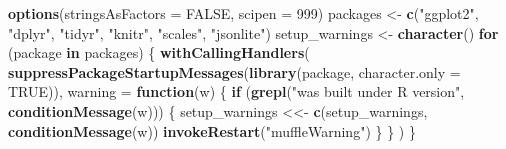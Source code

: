 \documentclass[
]{article}
\newenvironment{Shaded}{\begin{snugshade}}{\end{snugshade}}
\newcommand{\AttributeTok}[1]{\textcolor[rgb]{0.13,0.29,0.53}{#1}}
\newcommand{\ConstantTok}[1]{\textcolor[rgb]{0.56,0.35,0.01}{#1}}
\newcommand{\ControlFlowTok}[1]{\textcolor[rgb]{0.13,0.29,0.53}{\textbf{#1}}}
\newcommand{\DecValTok}[1]{\textcolor[rgb]{0.00,0.00,0.81}{#1}}
\newcommand{\FunctionTok}[1]{\textcolor[rgb]{0.13,0.29,0.53}{\textbf{#1}}}
\newcommand{\NormalTok}[1]{#1}
\newcommand{\OtherTok}[1]{\textcolor[rgb]{0.56,0.35,0.01}{#1}}
\newcommand{\StringTok}[1]{\textcolor[rgb]{0.31,0.60,0.02}{#1}}
\begin{document}
\begin{Shaded}
\begin{Highlighting}[]
\FunctionTok{options}\NormalTok{(}\AttributeTok{stringsAsFactors =} \ConstantTok{FALSE}\NormalTok{, }\AttributeTok{scipen =} \DecValTok{999}\NormalTok{)}
\NormalTok{packages }\OtherTok{\textless{}{-}} \FunctionTok{c}\NormalTok{(}\StringTok{"ggplot2"}\NormalTok{, }\StringTok{"dplyr"}\NormalTok{, }\StringTok{"tidyr"}\NormalTok{, }\StringTok{"knitr"}\NormalTok{, }\StringTok{"scales"}\NormalTok{, }\StringTok{"jsonlite"}\NormalTok{)}
\NormalTok{setup\_warnings }\OtherTok{\textless{}{-}} \FunctionTok{character}\NormalTok{()}
\ControlFlowTok{for}\NormalTok{ (package }\ControlFlowTok{in}\NormalTok{ packages) \{}
  \FunctionTok{withCallingHandlers}\NormalTok{(}
    \FunctionTok{suppressPackageStartupMessages}\NormalTok{(}\FunctionTok{library}\NormalTok{(package, }\AttributeTok{character.only =} \ConstantTok{TRUE}\NormalTok{)),}
    \AttributeTok{warning =} \ControlFlowTok{function}\NormalTok{(w) \{}
      \ControlFlowTok{if}\NormalTok{ (}\FunctionTok{grepl}\NormalTok{(}\StringTok{"was built under R version"}\NormalTok{, }\FunctionTok{conditionMessage}\NormalTok{(w))) \{}
\NormalTok{        setup\_warnings }\OtherTok{\textless{}\textless{}{-}} \FunctionTok{c}\NormalTok{(setup\_warnings, }\FunctionTok{conditionMessage}\NormalTok{(w))}
        \FunctionTok{invokeRestart}\NormalTok{(}\StringTok{"muffleWarning"}\NormalTok{)}
\NormalTok{      \}}
\NormalTok{    \}}
\NormalTok{  )}
\NormalTok{\}}


\end{Highlighting}
\end{Shaded}
\end{document}
